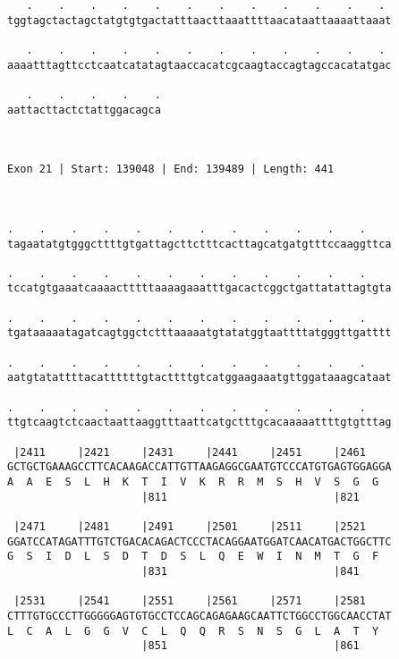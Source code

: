 \documentclass{article}
\begin{document}
\begin{Verbatim}
   .    .    .    .    .    .    .    .    .    .    .    . 
tggtagctactagctatgtgtgactatttaacttaaattttaacataattaaaattaaat
                                                            
   .    .    .    .    .    .    .    .    .    .    .    . 
aaaatttagttcctcaatcatatagtaaccacatcgcaagtaccagtagccacatatgac
                                                            
   .    .    .    .    .
aattacttactctattggacagca
                        
                        
 
Exon 21 | Start: 139048 | End: 139489 | Length: 441



.    .    .    .    .    .    .    .    .    .    .    .    
tagaatatgtgggcttttgtgattagcttctttcacttagcatgatgtttccaaggttca
                                                            
.    .    .    .    .    .    .    .    .    .    .    .    
tccatgtgaaatcaaaactttttaaaagaaatttgacactcggctgattatattagtgta
                                                            
.    .    .    .    .    .    .    .    .    .    .    .    
tgataaaaatagatcagtggctctttaaaaatgtatatggtaattttatgggttgatttt
                                                            
.    .    .    .    .    .    .    .    .    .    .    .    
aatgtatattttacattttttgtacttttgtcatggaagaaatgttggataaagcataat
                                                            
.    .    .    .    .    .    .    .    .    .    .    .    
ttgtcaagtctcaactaattaaggtttaattcatgctttgcacaaaaattttgtgtttag
                                                            
 |2411     |2421     |2431     |2441     |2451     |2461    
GCTGCTGAAAGCCTTCACAAGACCATTGTTAAGAGGCGAATGTCCCATGTGAGTGGAGGA
A  A  E  S  L  H  K  T  I  V  K  R  R  M  S  H  V  S  G  G  
                     |811                          |821     
  
 |2471     |2481     |2491     |2501     |2511     |2521    
GGATCCATAGATTTGTCTGACACAGACTCCCTACAGGAATGGATCAACATGACTGGCTTC
G  S  I  D  L  S  D  T  D  S  L  Q  E  W  I  N  M  T  G  F  
                     |831                          |841     
  
 |2531     |2541     |2551     |2561     |2571     |2581    
CTTTGTGCCCTTGGGGGAGTGTGCCTCCAGCAGAGAAGCAATTCTGGCCTGGCAACCTAT
L  C  A  L  G  G  V  C  L  Q  Q  R  S  N  S  G  L  A  T  Y  
                     |851                          |861     
  

\end{Verbatim}
\end{document}
